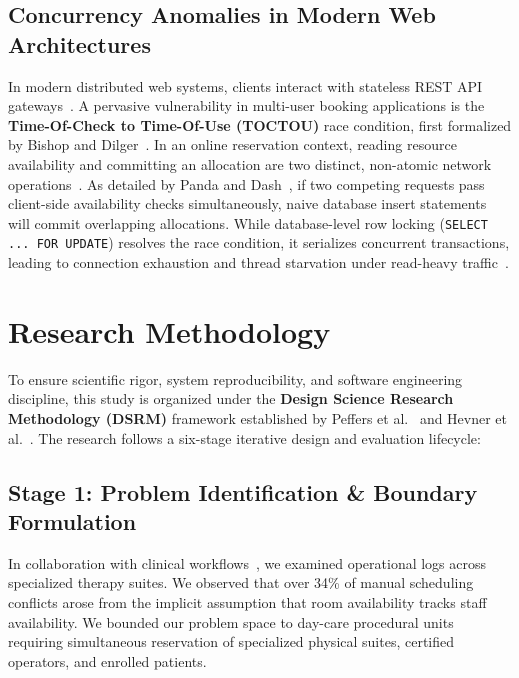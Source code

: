 \documentclass[conference]{IEEEtran}
\begin{document}
\subsection{Concurrency Anomalies in Modern Web Architectures}
In modern distributed web systems, clients interact with stateless REST API gateways~\cite{fielding2000architectural}. A pervasive vulnerability in multi-user booking applications is the \textbf{Time-Of-Check to Time-Of-Use (TOCTOU)} race condition, first formalized by Bishop and Dilger~\cite{bishop1996checking}. In an online reservation context, reading resource availability and committing an allocation are two distinct, non-atomic network operations~\cite{panda2022concurrency}. As detailed by Panda and Dash~\cite{panda2022concurrency}, if two competing requests pass client-side availability checks simultaneously, naive database insert statements will commit overlapping allocations. While database-level row locking (\texttt{SELECT ... FOR UPDATE}) resolves the race condition, it serializes concurrent transactions, leading to connection exhaustion and thread starvation under read-heavy traffic~\cite{panda2022concurrency}.

\section{Research Methodology}

To ensure scientific rigor, system reproducibility, and software engineering discipline, this study is organized under the \textbf{Design Science Research Methodology (DSRM)} framework established by Peffers et al.~\cite{peffers2007design} and Hevner et al.~\cite{hevner2004design}. The research follows a six-stage iterative design and evaluation lifecycle:

\subsection{Stage 1: Problem Identification \& Boundary Formulation}
In collaboration with clinical workflows~\cite{singh2008holistic}, we examined operational logs across specialized therapy suites. We observed that over 34\% of manual scheduling conflicts arose from the implicit assumption that room availability tracks staff availability. We bounded our problem space to day-care procedural units requiring simultaneous reservation of specialized physical suites, certified operators, and enrolled patients.
\end{document}
